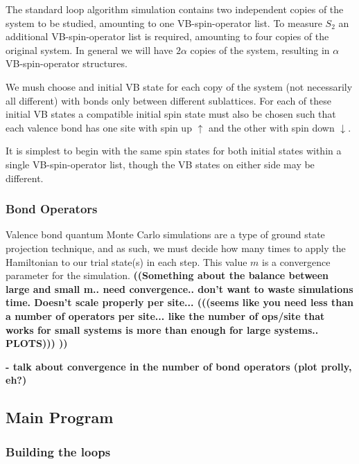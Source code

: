 \documentclass[prb,aps,twocolumn,floatfix,amsmath,amssymb,superscriptaddress,tightenlines]{revtex4}
\begin{document}
The standard loop algorithm simulation contains two independent copies of the system to be studied, amounting to one VB-spin-operator list. 
To measure $S_2$ an additional VB-spin-operator list is required, amounting to four copies of the original system.
In general we will have $2\alpha$ copies of the system, resulting in $\alpha$ VB-spin-operator structures.
	
We mush choose and initial VB state for each copy of the system (not necessarily all different) with bonds only between different sublattices. 
For each of these initial VB states a compatible initial spin state must also be chosen such that each valence bond has one site with spin up $\uparrow$ and the other with spin down $\downarrow$.

It is simplest to begin with the same spin states for both initial states within a single VB-spin-operator list, though the VB states on either side may be different.	
	
	
\subsubsection{Bond Operators}

Valence bond quantum Monte Carlo simulations are a type of ground state projection technique, and as such, we must decide how many times to apply the Hamiltonian to our trial state(s) in each step.  
This value $m$ is a convergence parameter for the simulation.
{\bf ((Something about the balance between large and small m.. need convergence.. don't want to waste simulations time.  Doesn't scale properly per site...   (((seems like you need less than a number of operators per site... like the number of ops/site that works for small systems is more than enough for large systems.. PLOTS)))   )) }



\noindent
{\bf
- talk about convergence in the number of bond operators (plot prolly, eh?)\\
}

\subsection{Main Program}
\subsubsection{Building the loops}
\end{document}
